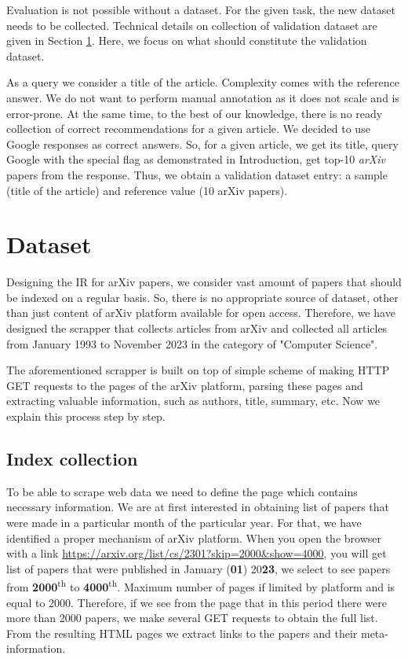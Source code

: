 \documentclass{article}
\begin{document}
        Evaluation is not possible without a dataset. For the given task, the new dataset needs to be collected. Technical details on collection of validation dataset are given in Section \ref{sec:dataset}. Here, we focus on what should constitute the validation dataset.

        As a query we consider a title of the article. Complexity comes with the reference answer. We do not want to perform manual annotation as it does not scale and is error-prone. At the same time, to the best of our knowledge, there is no ready collection of correct recommendations for a given article. We decided to use Google responses as correct answers. So, for a given article, we get its title, query Google with the special flag as demonstrated in Introduction, get top-10 \textit{arXiv} papers from the response. Thus, we obtain a validation dataset entry: a sample (title of the article) and reference value (10 arXiv papers). 

\section{Dataset}\label{sec:dataset}
    
    Designing the IR for arXiv papers, we consider vast amount of papers that should be indexed on a regular basis. So, there is no appropriate source of dataset, other than just content of arXiv platform available for open access. Therefore, we have designed the scrapper that collects articles from arXiv and collected all articles from January 1993 to November 2023 in the category of "Computer Science".

    The aforementioned scrapper is built on top of simple scheme of making HTTP GET requests to the pages of the arXiv platform, parsing these pages and extracting valuable information, such as authors, title, summary, etc. Now we explain this process step by step.

    \subsection{Index collection}

        To be able to scrape web data we need to define the page which contains necessary information. We are at first interested in obtaining list of papers that were made in a particular month of the particular year. For that, we have identified a proper mechanism of arXiv platform. When you open the browser with a link \url{https://arxiv.org/list/cs/2301?skip=2000&show=4000}, you will get list of papers that were published in January (\textbf{01}) 20\textbf{23}, we select to see papers from \textbf{2000}\textsuperscript{th} to \textbf{4000}\textsuperscript{th}. Maximum number of pages if limited by platform and is equal to 2000. Therefore, if we see from the page that in this period there were more than 2000 papers, we make several GET requests to obtain the full list. From the resulting HTML pages we extract links to the papers and their meta-information. 
        
\end{document}
